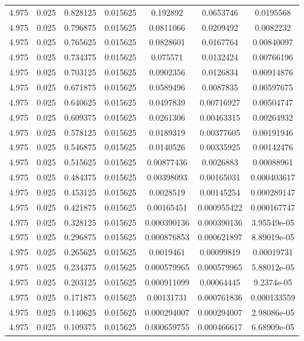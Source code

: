 \begin{flushleft}
\begin{longtable}{ccccccc}
4.975 & 0.025 & 0.828125 & 0.015625 & 0.192892 & 0.0653746 & 0.0195568  \\ 
4.975 & 0.025 & 0.796875 & 0.015625 & 0.0811066 & 0.0209492 & 0.0082232  \\ 
4.975 & 0.025 & 0.765625 & 0.015625 & 0.0828601 & 0.0167764 & 0.00840097  \\ 
4.975 & 0.025 & 0.734375 & 0.015625 & 0.075571 & 0.0132424 & 0.00766196  \\ 
4.975 & 0.025 & 0.703125 & 0.015625 & 0.0902356 & 0.0126834 & 0.00914876  \\ 
4.975 & 0.025 & 0.671875 & 0.015625 & 0.0589496 & 0.0087835 & 0.00597675  \\ 
4.975 & 0.025 & 0.640625 & 0.015625 & 0.0497839 & 0.00716927 & 0.00504747  \\ 
4.975 & 0.025 & 0.609375 & 0.015625 & 0.0261306 & 0.00463315 & 0.00264932  \\ 
4.975 & 0.025 & 0.578125 & 0.015625 & 0.0189319 & 0.00377605 & 0.00191946  \\ 
4.975 & 0.025 & 0.546875 & 0.015625 & 0.0140526 & 0.00335925 & 0.00142476  \\ 
4.975 & 0.025 & 0.515625 & 0.015625 & 0.00877436 & 0.0026883 & 0.00088961  \\ 
4.975 & 0.025 & 0.484375 & 0.015625 & 0.00398093 & 0.00165031 & 0.000403617  \\ 
4.975 & 0.025 & 0.453125 & 0.015625 & 0.0028519 & 0.00145254 & 0.000289147  \\ 
4.975 & 0.025 & 0.421875 & 0.015625 & 0.00165451 & 0.000955422 & 0.000167747  \\ 
4.975 & 0.025 & 0.328125 & 0.015625 & 0.000390136 & 0.000390136 & 3.95549e-05  \\ 
4.975 & 0.025 & 0.296875 & 0.015625 & 0.000876853 & 0.000621897 & 8.89019e-05  \\ 
4.975 & 0.025 & 0.265625 & 0.015625 & 0.0019461 & 0.00099819 & 0.00019731  \\ 
4.975 & 0.025 & 0.234375 & 0.015625 & 0.000579965 & 0.000579965 & 5.88012e-05  \\ 
4.975 & 0.025 & 0.203125 & 0.015625 & 0.000911099 & 0.00064445 & 9.2374e-05  \\ 
4.975 & 0.025 & 0.171875 & 0.015625 & 0.00131731 & 0.000761836 & 0.000133559  \\ 
4.975 & 0.025 & 0.140625 & 0.015625 & 0.000294007 & 0.000294007 & 2.98086e-05  \\ 
4.975 & 0.025 & 0.109375 & 0.015625 & 0.000659755 & 0.000466617 & 6.68909e-05  \\ 

\end{longtable}
\end{flushleft}
